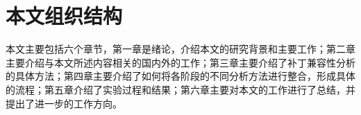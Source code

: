 %
%
%
%
%


\section{本文组织结构}

本文主要包括六个章节，第一章是绪论，介绍本文的研究背景和主要工作；第二章主要介绍与本文所述内容相关的国内外的工作；第三章主要介绍了补丁兼容性分析的具体方法；第四章主要介绍了如何将各阶段的不同分析方法进行整合，形成具体的流程；第五章介绍了实验过程和结果；第六章主要对本文的工作进行了总结，并提出了进一步的工作方向。


